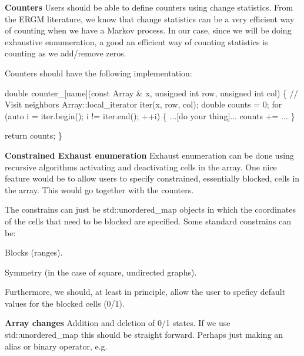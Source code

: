 \begin{DoxyItemize}
\item {\bfseries Counters} Users should be able to define counters using change statistics. From the E\+R\+GM literature, we know that change statistics can be a very efficient way of counting when we have a Markov process. In our case, since we will be doing exhaustive ennumeration, a good an efficient way of counting statistics is counting as we add/remove zeros.

Counters should have the following implementation\+:
\end{DoxyItemize}


\begin{DoxyCode}
\textcolor{keywordtype}{double} counter\_[name](\textcolor{keyword}{const} Array & x, \textcolor{keywordtype}{unsigned} \textcolor{keywordtype}{int} row, \textcolor{keywordtype}{unsigned} \textcolor{keywordtype}{int} col) \{
  \textcolor{comment}{// Visit neighbors}
  Array::local\_iterator iter(x, row, col);
  \textcolor{keywordtype}{double} counts = 0;
  \textcolor{keywordflow}{for} (\textcolor{keyword}{auto} i = iter.begin(); i != iter.end(); ++i) \{
    ...[\textcolor{keywordflow}{do} your thing]...
    counts += ...
  \}

  \textcolor{keywordflow}{return} counts;
\}
\end{DoxyCode}



\begin{DoxyItemize}
\item {\bfseries Constrained Exhaust enumeration} Exhaust enumeration can be done using recursive algorithms activating and deactivating cells in the array. One nice feature would be to allow users to specify constrained, essentially blocked, cells in the array. This would go together with the counters.

The constrains can just be {\ttfamily std\+::unordered\+\_\+map} objects in which the coordinates of the cells that need to be blocked are specified. Some standard constrains can be\+:
\begin{DoxyItemize}
\item Blocks (ranges).
\item Symmetry (in the case of square, undirected graphs).
\end{DoxyItemize}

Furthermore, we should, at least in principle, allow the user to speficy default values for the blocked cells (0/1).
\item {\bfseries Array changes} Addition and deletion of 0/1 states. If we use {\ttfamily std\+::unordered\+\_\+map} this should be straight forward. Perhaps just making an alias or binary operator, e.\+g.
\end{DoxyItemize}



